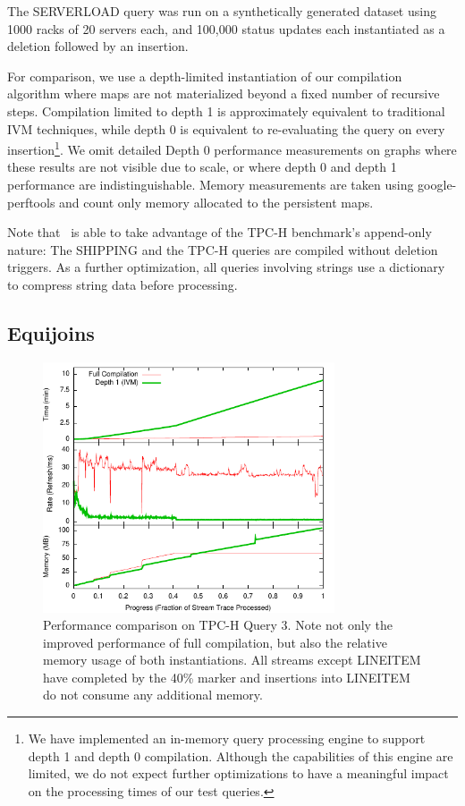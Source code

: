 The SERVERLOAD query was run on a synthetically generated dataset using 1000 racks of 20 servers each, and 100,000 status updates each instantiated as a deletion followed by an insertion.

For comparison, we use a depth-limited instantiation of our compilation algorithm where maps are not materialized beyond a fixed number of recursive steps.  Compilation limited to depth 1 is approximately equivalent to traditional IVM techniques, while depth 0 is equivalent to re-evaluating the query on every insertion\footnote{We have implemented an in-memory query processing engine to support depth 1 and depth 0 compilation.  Although the capabilities of this engine are limited, we do not expect further optimizations  to have a meaningful impact on the processing times of our test queries.}.  We omit detailed Depth 0 performance measurements on graphs where these results are not visible due to scale, or where depth 0 and depth 1 performance are indistinguishable.  Memory measurements are taken using google-perftools\cite{perftools} and count only memory allocated to the persistent maps.

Note that \dbtoaster\ is able to take advantage of the TPC-H benchmark's append-only nature: The SHIPPING and the TPC-H queries are compiled without deletion triggers.  As a further optimization, all queries involving strings use a dictionary to compress string data before processing.

\subsection{Equijoins}

\begin{figure}
\begin{center}
\includegraphics[width=3.4in]{../graphs/graphs/unified_tpch3.pdf}
\caption{Performance comparison on TPC-H Query 3.  Note not only the improved performance of full compilation, but also the relative memory usage of both instantiations.  All streams except LINEITEM have completed by the 40\% marker and insertions into LINEITEM do not consume any additional memory.}
\label{fig:experiments:tpch3}
\end{center}
\end{figure}

